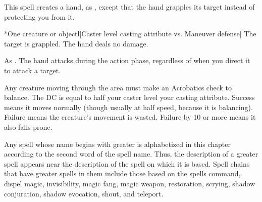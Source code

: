 \begin{spellheader}
    \spellrng{\rngmed}
    \spelldur{\durshort \dismissable}
\end{spellheader}
\begin{spelleffects}
    \spellline
    \spelleffect This spell creates a hand, as , except that the hand grapples its target instead of protecting you from it.
    \begin{spelltarget}*{One creature or object}l[Caster level \add casting attribute vs. Maneuver defense]
        \spellsuccess The target is grappled. The hand deals no damage.
    \end{spelltarget}
\end{spelleffects}
\begin{spellfooter}
    \spellnotes As . The hand attacks during the action phase, regardless of when you direct it to attack a target.
\end{spellfooter}

\begin{spellheader}
    \spelldur{\durshort \dismissable}
\end{spellheader}
\begin{spelleffects}
    \spellline
    \spelleffect Any creature moving through the area must make an Acrobatics check to balance. The DC is equal to half your caster level \add your casting attribute. Success means it moves normally (though usually at half speed, because it is balancing). Failure means the creature's movement is wasted. Failure by 10 or more means it also falls prone.

    \par Any spell whose name begins with greater is alphabetized in this chapter according to the second word of the spell name. Thus, the description of a greater spell appears near the description of the spell on which it is based. Spell chains that have greater spells in them include those based on the spells command, dispel magic, invisibility, magic fang, magic weapon, restoration, scrying, shadow conjuration, shadow evocation, shout, and teleport.
\end{spelleffects}

